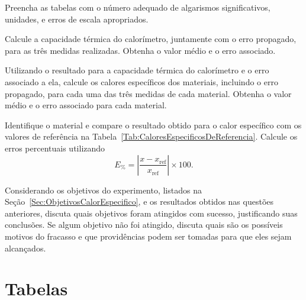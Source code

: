 \begin{question}[type={exam}]{1.5}
Preencha as tabelas com o número adequado de algarismos significativos, unidades, e erros de escala apropriados. 
\end{question}

\begin{question}[type={exam}]{2}
Calcule a capacidade térmica do calorímetro, juntamente com o erro propagado, para as três medidas realizadas. Obtenha o valor médio e o erro associado.
\end{question}

\begin{question}[type={exam}]{2}
Utilizando o resultado para a capacidade térmica do calorímetro e o erro associado a ela, calcule os calores específicos dos materiais, incluindo o erro propagado, para cada uma das três medidas de cada material. Obtenha o valor médio e o erro associado para cada material.
\end{question}

\begin{question}[type={exam}]{1}
Identifique o material e compare o resultado obtido para o calor específico com os valores de referência na Tabela~\ref{Tab:CaloresEspecificosDeReferencia}. Calcule os erros percentuais utilizando
\begin{equation}
	E_{\%} = \left|\frac{x-x_{\text{ref}}}{x_{\text{ref}}}\right| \times 100.
\end{equation}
\end{question}

\begin{question}[type={exam}]{1.5}
Considerando os objetivos do experimento, listados na Seção~\ref{Sec:ObjetivosCalorEspecifico}, e os resultados obtidos nas questões anteriores, discuta quais objetivos foram atingidos com sucesso, justificando suas conclusões. Se algum objetivo não foi atingido, discuta quais são os possíveis motivos do fracasso e que providências podem ser tomadas para que eles sejam alcançados.
\end{question}

\vfill
\pagebreak
\section{Tabelas}

